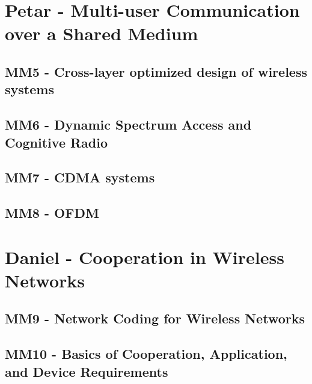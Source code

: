 \part{Petar - Multi-user Communication over a Shared Medium}
\chapter{MM5 - Cross-layer optimized design of wireless systems}






\chapter{MM6 - Dynamic Spectrum Access and Cognitive Radio}


\chapter{MM7 - CDMA systems}



\chapter{MM8 - OFDM}



\part{Daniel - Cooperation in Wireless Networks}
\chapter{MM9 - Network Coding for Wireless Networks}





\chapter{MM10 - Basics of Cooperation, Application, and Device Requirements}





